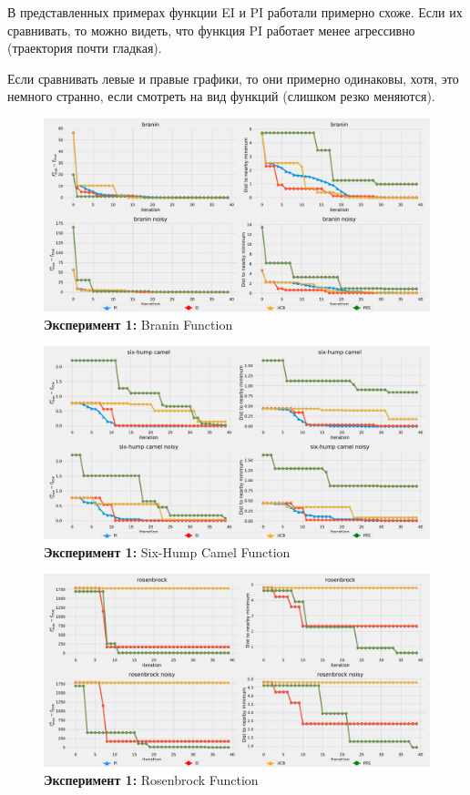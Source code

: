 \documentclass[12pt,fleqn]{article}
\begin{document}
	В представленных примерах функции EI и PI работали примерно схоже. Если их сравнивать, то можно видеть, что функция PI работает менее агрессивно (траектория почти гладкая).
	
	Если сравнивать левые и правые графики, то они примерно одинаковы, хотя, это немного странно, если смотреть на вид функций (слишком резко меняются).
	
	\begin{figure}[!h]
		\includegraphics[scale=0.25,center]{../code/exp1/branin.pdf}
		\caption{\textbf{Эксперимент 1:} Branin Function}
		\label{fig:exp1_branin}
	\end{figure}
	
	\begin{figure}[!h]
		\includegraphics[scale=0.25,center]{../code/exp1/hump.pdf}
		\caption{\textbf{Эксперимент 1:} Six-Hump Camel Function}
		\label{fig:exp1_hump}
	\end{figure}

	\begin{figure}[!h]
		\includegraphics[scale=0.25,center]{../code/exp1/rosenbrock.pdf}
		\caption{\textbf{Эксперимент 1:} Rosenbrock Function}
		\label{fig:exp1_rosenbrock}
	\end{figure}
	
\end{document}
